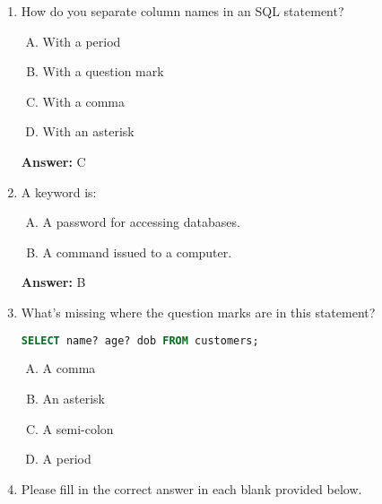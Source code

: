 \documentclass[12pt]{article}
\begin{document}
\begin{enumerate}[1.]
    \item

    How do you separate column names in an SQL statement?

    \bigskip

    \begin{enumerate}[A.]
        \item With a period
        \item With a question mark
        \item With a comma
        \item With an asterisk
    \end{enumerate}

    \bigskip

    \textbf{Answer:} C

    \item

    A keyword is:

    \bigskip

    \begin{enumerate}[A.]
        \item A password for accessing databases.
        \item A command issued to a computer.
    \end{enumerate}

    \bigskip

    \textbf{Answer:} B

    \item

    What's missing where the question marks are in this statement?

    \bigskip

    \begin{lstlisting}[language=SQL]
    SELECT name? age? dob FROM customers;
    \end{lstlisting}

    \bigskip

    \begin{enumerate}[A.]
        \item A comma
        \item An asterisk
        \item A semi-colon
        \item A period
    \end{enumerate}

    \item

    Please fill in the correct answer in each blank provided below.


\end{enumerate}
\end{document}
